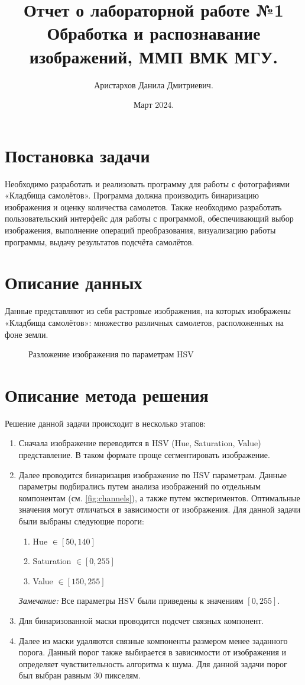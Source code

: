 \documentclass[11pt]{extarticle}
\title{Отчет о лабораторной работе №1 \\[6mm] \large Обработка и распознавание изображений, ММП ВМК МГУ.}
\author{Аристархов Данила Дмитриевич.}
\date{Март 2024.}
\begin{document}
\maketitle
{
  \hypersetup{linkcolor=black}
  \tableofcontents
}
\newpage

\section{Постановка задачи}
Необходимо разработать и реализовать программу для работы с фотографиями «Кладбища самолётов». Программа должна производить бинаризацию изображения и оценку количества самолетов. Также необходимо разработать пользовательский интерфейс для работы с программой, обеспечивающий выбор изображения, выполнение операций преобразования, визуализацию работы программы, выдачу результатов подсчёта самолётов.

\section{Описание данных}
Данные представляют из себя растровые изображения, на которых изображены «Кладбища самолётов»: множество различных самолетов, расположенных на фоне земли.

\begin{figure}[h]
  \centering
  
  \caption{Разложение изображения по параметрам HSV}
  \label{fig:channels}
\end{figure}

\section{Описание метода решения}
Решение данной задачи происходит в несколько этапов:
\begin{enumerate}
  \item Сначала изображение переводится в HSV (Hue, Saturation, Value) представление. В таком формате проще сегментировать изображение.
  \item Далее проводится бинаризация изображение по HSV параметрам. Данные параметры подбирались путем анализа изображений по отдельным компонентам (см. \autoref{fig:channels}), а также путем экспериментов. Оптимальные значения могут отличаться в зависимости от изображения. Для данной задачи были выбраны следующие пороги: \begin{enumerate}
    \item Hue $\in [50, 140]$
    \item Saturation $\in [0, 255]$
    \item Value $\in [150, 255]$
  \end{enumerate}
  \textit{Замечание:} Все параметры HSV были приведены к значениям $[0, 255]$.
  \item Для бинаризованной маски проводится подсчет связных компонент.
  \item Далее из маски удаляются связные компоненты размером менее заданного порога. Данный порог также выбирается в зависимости от изображения и определяет чувствительность алгоритма к шума. Для данной задачи порог был выбран равным 30 пикселям.
\end{enumerate}
\end{document}
